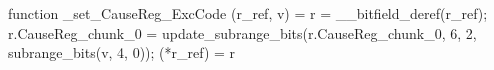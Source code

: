 function _set_CauseReg_ExcCode (r_ref, v) = {
    r = __bitfield_deref(r_ref);
    r.CauseReg_chunk_0 = update_subrange_bits(r.CauseReg_chunk_0, 6, 2, subrange_bits(v, 4, 0));
    (*r_ref) = r
}
